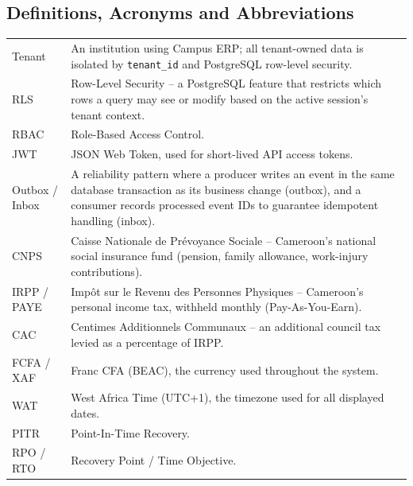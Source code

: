 \subsection{Definitions, Acronyms and Abbreviations}
\begin{longtable}{L{3.3cm}L{11cm}}
  \toprule
   &  \\
  \midrule
  \endhead
  Tenant & An institution using Campus ERP; all tenant-owned data is isolated
    by \texttt{tenant\_id} and PostgreSQL row-level security. \\
  RLS & Row-Level Security -- a PostgreSQL feature that restricts which rows a
    query may see or modify based on the active session's tenant context. \\
  RBAC & Role-Based Access Control. \\
  JWT & JSON Web Token, used for short-lived API access tokens. \\
  Outbox / Inbox & A reliability pattern where a producer writes an event in
    the same database transaction as its business change (outbox), and a
    consumer records processed event IDs to guarantee idempotent handling
    (inbox). \\
  CNPS & Caisse Nationale de Pr\'evoyance Sociale -- Cameroon's national social
    insurance fund (pension, family allowance, work-injury contributions). \\
  IRPP / PAYE & Imp\^ot sur le Revenu des Personnes Physiques -- Cameroon's
    personal income tax, withheld monthly (Pay-As-You-Earn). \\
  CAC & Centimes Additionnels Communaux -- an additional council tax levied as
    a percentage of IRPP. \\
  FCFA / XAF & Franc CFA (BEAC), the currency used throughout the system. \\
  WAT & West Africa Time (UTC+1), the timezone used for all displayed dates. \\
  PITR & Point-In-Time Recovery. \\
  RPO / RTO & Recovery Point / Time Objective. \\
  \bottomrule
\end{longtable}

